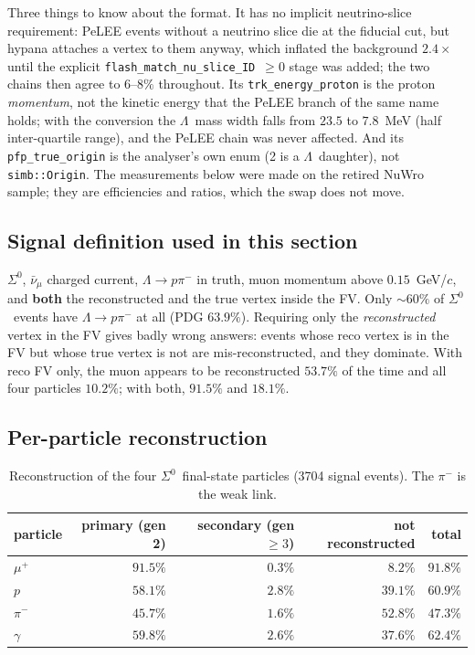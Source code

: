 \documentclass[11pt,a4paper]{article}
\newcommand{\Szero}{\ensuremath{\Sigma^{0}}}
\newcommand{\Lam}{\ensuremath{\Lambda}}
\newcommand{\numubar}{\ensuremath{\bar{\nu}_\mu}}
\begin{document}
Three things to know about the format. It has no implicit neutrino-slice
requirement: PeLEE events without a neutrino slice die at the fiducial cut, but
hypana attaches a vertex to them anyway, which inflated the background $2.4\times$
until the explicit \texttt{flash\_match\_nu\_slice\_ID}~$\geq0$ stage was added; the
two chains then agree to $6$--$8\%$ throughout. Its \texttt{trk\_energy\_proton} is
the proton \emph{momentum}, not the kinetic energy that the PeLEE branch of the same
name holds; with the conversion the \Lam\ mass width falls from $23.5$ to $7.8$~MeV
(half inter-quartile range), and the PeLEE chain was never affected. And its
\texttt{pfp\_true\_origin} is the analyser's own enum (2 is a \Lam\ daughter), not
\texttt{simb::Origin}. The measurements below were made on the retired NuWro
sample; they are efficiencies and ratios, which the swap does not move.

\subsection{Signal definition used in this section}

\Szero, $\numubar$ charged current, $\Lam \to p\pi^-$ in truth, muon momentum above
$0.15$~GeV/$c$, and \textbf{both} the reconstructed and the true vertex inside the
FV. Only $\sim 60\%$ of \Szero\ events have $\Lam \to p\pi^-$ at all (PDG $63.9\%$).
Requiring only the \emph{reconstructed} vertex in the FV gives badly wrong answers:
events whose reco vertex is in the FV but whose true vertex is not are
mis-reconstructed, and they dominate. With reco FV only, the muon appears to be
reconstructed $53.7\%$ of the time and all four particles $10.2\%$; with both, $91.5\%$
and $18.1\%$.

\subsection{Per-particle reconstruction}

\begin{table}[h]\centering
\begin{tabular}{lrrrr}
\toprule
particle & primary (gen 2) & secondary (gen $\geq3$) & not reconstructed & total \\
\midrule
$\mu^+$   & $91.5\%$ & $0.3\%$ & $8.2\%$  & $91.8\%$ \\
$p$       & $58.1\%$ & $2.8\%$ & $39.1\%$ & $60.9\%$ \\
$\pi^-$   & $45.7\%$ & $1.6\%$ & $52.8\%$ & $\mathbf{47.3\%}$ \\
$\gamma$  & $59.8\%$ & $2.6\%$ & $37.6\%$ & $62.4\%$ \\
\bottomrule
\end{tabular}
\caption{Reconstruction of the four \Szero\ final-state particles (3704 signal
events). The $\pi^-$ is the weak link.}
\label{tab:recoeff}
\end{table}
\end{document}
